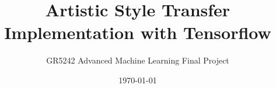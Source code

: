 \documentclass[letterpaper,12pt, oneside]{layout}
\title{Artistic Style Transfer Implementation with Tensorflow}
\subtitle{GR5242 Advanced Machine Learning Final Project}
\date{\today}
\begin{document}
\cleardoublepage
\maketitle

\frontmatter



\tableofcontents


\mainmatter





\appendix
\renewcommand\theequation{\Alph{chapter}--\arabic{equation}}
\renewcommand\thefigure{\Alph{chapter}--\arabic{figure}}
\renewcommand\thetable{\Alph{chapter}--\arabic{table}}





\backmatter



\end{document}
